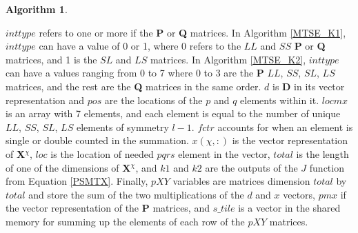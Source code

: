 \documentclass[12pt]{report}
\newtheorem{algorithm}[theorem]{Algorithm}
\begin{document}
\begin{algorithm}
\caption{Kernel 2 for MTSE}
\label{MTSE_K2}
\begin{algorithmic}


	\ELSE
	\ENDIF
	\ELSE
	\ENDIF
\ELSE
{}
\ENDIF
{}
	\ENDIF
\ENDFOR	 
{}
	
	\ELSE
	\ENDIF	
\ENDIF

\end{algorithmic}
\end{algorithm}

$inttype$ refers to one or more if the \textbf{P} or \textbf{Q} matrices. In Algorithm \ref{MTSE_K1}, $inttype$ can have a value of 0 or 1, where 0 refers to the $LL$ and $SS$ \textbf{P} or \textbf{Q} matrices, and 1 is the $SL$ and $LS$ matrices.  In Algorithm \ref{MTSE_K2}, $inttype$ can have a values ranging from 0 to 7 where 0 to 3 are the \textbf{P} $LL$, $SS$, $SL$, $LS$ matrices, and the rest are the \textbf{Q} matrices in the same order. $d$ is \textbf{D} in its vector representation and $pos$ are the locations of the $p$ and $q$ elements within it. $locmx$ is an array with 7 elements, and each element is equal to the number of unique $LL$, $SS$, $SL$, $LS$ elements of symmetry $l-1$. $fctr$ accounts for when an element is single or double counted in the summation. $x(\chi, :)$ is the vector representation of \textbf{X$^{\chi}$}, $loc$ is the location of needed $pqrs$ element in the vector, $total$ is the length of one of the dimensions of \textbf{X$^{\chi}$}, and $k1$ and $k2$ are the outputs of the $J$ function from Equation \ref{PSMTX}. Finally, $pXY$ variables are matrices dimension $total$ by $total$ and store the sum of the two multiplications of the $d$ and $x$ vectors, $pmx$ if the vector representation of the \textbf{P} matrices, and $s\_tile$ is a vector in the shared memory for summing up the elements of each row of the $pXY$ matrices. 
\end{document}
